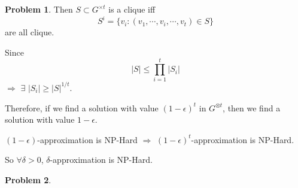 \documentclass[a4paper]{article}
\theoremstyle{definition}
\newtheorem{problem}{Problem}
\theoremstyle{plain}
\numberwithin{equation}{problem}
\begin{document}
\begin{problem}
  Then  $ S\subset G^{\times t} $ is a clique iff 
  \[S^i=\{v_i:(v_1,\cdots,v_i,\cdots,v_t)\in S\}\]
  are all  clique.
  
  Since 
  \[|S| \leq \prod_{i=1}^t|S_i|\]
  $ \Rightarrow $  $ \exists $  $ |S_i| \geq |S|^{1/t} $.
  
  Therefore, if we find a solution with value  $ (1-\epsilon)^t $ in  $ G^{\otimes t} $, then we find a solution with value   $ 1-\epsilon $.
  
  $ (1-\epsilon) $-approximation is NP-Hard  $ \Rightarrow  $  $ (1-\epsilon)^t$-approximation is NP-Hard.
  
  So  $ \forall \delta>0 $,  $ \delta $-approximation is NP-Hard.  

  

\end{problem}

\begin{problem}
  
\end{problem}
\end{document}
